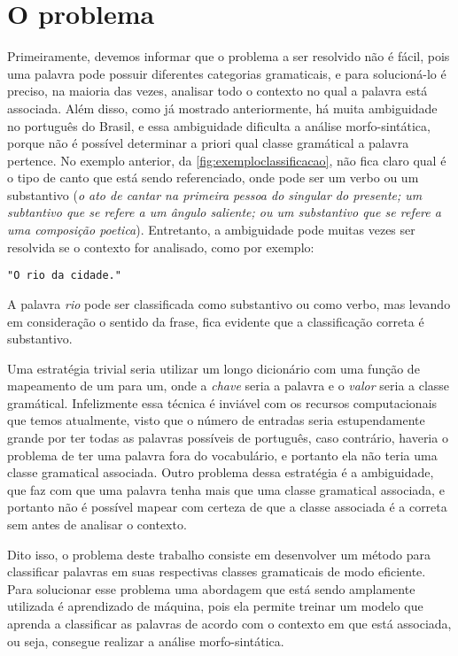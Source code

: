 \chapter{O problema}\label{oproblema}

Primeiramente, devemos informar que o problema a ser resolvido não é fácil, pois uma palavra pode possuir diferentes categorias gramaticais, e para solucioná-lo é  preciso, na maioria das vezes, analisar todo o contexto no qual a palavra está associada. Além disso, como já mostrado anteriormente, há muita ambiguidade no português do Brasil, e essa ambiguidade dificulta a análise morfo-sintática, porque não é possível determinar a priori qual classe gramátical a palavra pertence. No exemplo anterior, da \autoref{fig:exemploclassificacao}, não fica claro qual é o tipo de canto que está sendo referenciado, onde pode ser um verbo ou um substantivo (\textit{o ato de cantar na primeira pessoa do singular do presente; um subtantivo que se refere a um ângulo saliente; ou um substantivo que se refere a uma composição poetica}). Entretanto, a ambiguidade pode muitas vezes ser resolvida se o contexto for analisado, como por exemplo:

\begin{center}
\texttt{"O rio da cidade."}
\end{center}

A palavra \textit{rio} pode ser classificada como substantivo ou como verbo, mas levando em consideração o sentido da frase, fica evidente que a classificação correta é substantivo.

Uma estratégia trivial seria utilizar um longo dicionário com uma função de mapeamento de um para um, onde a \textit{chave} seria a palavra e o \textit{valor} seria a classe gramátical. Infelizmente essa técnica é inviável com os recursos computacionais que temos atualmente, visto que o número de entradas seria estupendamente grande por ter todas as palavras possíveis de português, caso contrário, haveria o
problema de ter uma palavra fora do vocabulário, e portanto ela não teria uma classe gramatical associada. Outro problema dessa estratégia é a ambiguidade, que faz com que uma palavra tenha mais que uma classe gramatical associada, e portanto não é possível mapear com certeza de que a classe associada é a correta sem antes de analisar o contexto.

Dito isso, o problema deste trabalho consiste em desenvolver um método para classificar palavras em suas respectivas classes gramaticais de modo eficiente. Para solucionar esse problema uma abordagem que está sendo amplamente utilizada é aprendizado de máquina, pois ela permite treinar um modelo que aprenda a classificar as palavras de acordo com o contexto em que está associada, ou seja, consegue realizar a análise morfo-sintática. 

